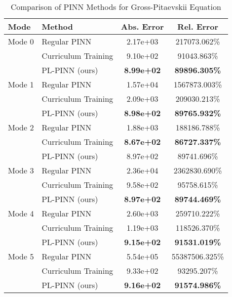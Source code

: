 \begin{table}[htbp]
\centering
\caption{Comparison of PINN Methods for Gross-Pitaevskii Equation}
\label{tab:pinn_comparison}
\begin{tabular}{llcc}
\toprule
Mode & Method & Abs. Error & Rel. Error \\
\midrule
Mode 0 & Regular PINN & 2.17e+03 & 217073.062\% \\
 & Curriculum Training & 9.10e+02 & 91043.863\% \\
 & PL-PINN (ours) & \textbf{8.99e+02} & \textbf{89896.305\%} \\
\midrule
Mode 1 & Regular PINN & 1.57e+04 & 1567873.003\% \\
 & Curriculum Training & 2.09e+03 & 209030.213\% \\
 & PL-PINN (ours) & \textbf{8.98e+02} & \textbf{89765.932\%} \\
\midrule
Mode 2 & Regular PINN & 1.88e+03 & 188186.788\% \\
 & Curriculum Training & \textbf{8.67e+02} & \textbf{86727.337\%} \\
 & PL-PINN (ours) & 8.97e+02 & 89741.696\% \\
\midrule
Mode 3 & Regular PINN & 2.36e+04 & 2362830.690\% \\
 & Curriculum Training & 9.58e+02 & 95758.615\% \\
 & PL-PINN (ours) & \textbf{8.97e+02} & \textbf{89744.469\%} \\
\midrule
Mode 4 & Regular PINN & 2.60e+03 & 259710.222\% \\
 & Curriculum Training & 1.19e+03 & 118526.370\% \\
 & PL-PINN (ours) & \textbf{9.15e+02} & \textbf{91531.019\%} \\
\midrule
Mode 5 & Regular PINN & 5.54e+05 & 55387506.325\% \\
 & Curriculum Training & 9.33e+02 & 93295.207\% \\
 & PL-PINN (ours) & \textbf{9.16e+02} & \textbf{91574.986\%} \\
\bottomrule
\end{tabular}
\end{table}